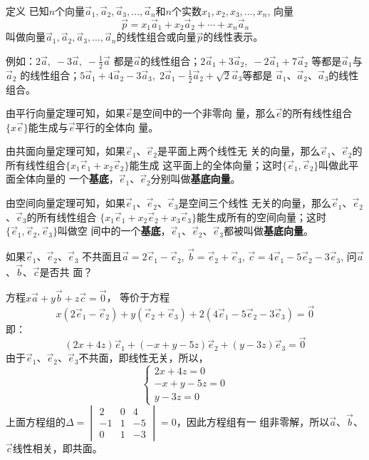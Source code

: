 \begin{blk}
 {定义} 已知$n$个向量$\vec{a}_1,\vec{a}_2,\vec{a}_3,\ldots, \vec{a}_n$和$n$个实数$x_1,x_2,x_3,\ldots,x_n$, 向量
 \[\vec{p}=x_1\vec{a}_1+x_2\vec{a}_2+\cdots+x_n\vec{a}_n\]
叫做向量$\vec{a}_1,\vec{a}_2,\vec{a}_3,\ldots, \vec{a}_n$的线性组合或向量$\vec{p}$的线性表示。
\end{blk}

例如：$2\vec{a},\; -3\vec{a},\; -\frac{1}{2}\vec{a}$
都是$\vec{a}$的线性组合；$2\vec{a}_1+3\vec{a}_2,\; -2\vec{a}_1+7\vec{a}_2$
等都是$\vec{a}_1$与$\vec{a}_2$
的线性组合；$5\vec{a}_1+4\vec{a}_2-3\vec{a}_3,\;  2\vec{a}_1-\frac{1}{2}\vec{a}_2+\sqrt{2}\vec{a}_3$等都是
$\vec{a}_1$、$\vec{a}_2$、$\vec{a}_3$的线性组合。

由平行向量定理可知，如果$\vec{e}$是空间中的一个非零向
量，那么$\vec{e}$的所有线性组合$\{x\vec{e}\}$能生成与$\vec{e}$平行的全体向
量。

由共面向量定理可知，如果$\vec{e}_1$、$\vec{e}_2$是平面上两个线性无
关的向量，那么$\vec{e}_1$、$\vec{e}_2$的所有线性组合$\{x_1\vec{e}_1+x_2\vec{e}_2\}$能生成
这平面上的全体向量；这时$\{\vec{e}_1,\vec{e}_2\}$叫做此平面全体向量的
一个\textbf{基底}，$\vec{e}_1$、$\vec{e}_2$分别叫做\textbf{基底向量}。

由空间向量定理可知，如果$\vec{e}_1$、$\vec{e}_2$、$\vec{e}_3$是空间三个线性
无关的向量，那么$\vec{e}_1$、$\vec{e}_2$、$\vec{e}_3$的所有线性组合
$\{x_1\vec{e}_1+x_2\vec{e}_2+x_3\vec{e}_3\}$能生成所有的空间向量；这时$\{\vec{e}_1,\vec{e}_2,\vec{e}_3\}$叫做空
间中的一个\textbf{基底}，$\vec{e}_1$、$\vec{e}_2$、$\vec{e}_3$都被叫做\textbf{基底向量}。

\begin{example}
    如果$\vec{e}_1$、$\vec{e}_2$、$\vec{e}_3$
不共面且$\vec{a}=2\vec{e}_1-\vec{e}_2$, 
$\vec{b}=\vec{e}_2+\vec{e}_3$, $\vec{c}=4\vec{e}_1-5\vec{e}_2-3\vec{e}_3$, 问$\vec{a}$、$\vec{b}$、$\vec{c}$是否共
面？
\end{example}

\begin{solution}
    方程$x\vec{a}+y\vec{b}+z\vec{c}=\vec{0}$，
等价于方程
\[
x(2\vec{e}_1-\vec{e}_2)+y(\vec{e}_2+\vec{e}_3)+2(4\vec{e}_1-5\vec{e}_2-3\vec{e}_3)=\vec{0}\]
即：
\[(2x+4z)\vec{e}_1+(-x+y-5z)\vec{e}_2+(y-3z)\vec{e}_3=\vec{0}\]
由于$\vec{e}_1$、$\vec{e}_2$、$\vec{e}_3$不共面，即线性无关，所以，
\[\begin{cases}
    2x+4z=0\\ -x+y-5z=0\\ y-3z=0
\end{cases}\]
上面方程组的$\Delta=\begin{vmatrix}
    2&0&4\\
    -1&1&-5\\
    0&1&-3
\end{vmatrix}=0$，因此方程组有一
组非零解，所以$\vec{a}$、$\vec{b}$、$\vec{c}$线性相关，即共面。
\end{solution}

